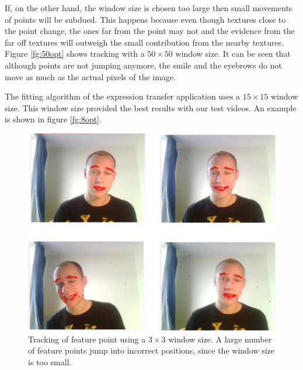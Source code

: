 \documentclass[11pt,a4paper,twoside]{report}
\begin{document}
If, on the other hand, the window size is chosen too large then small movements of
points will be subdued. This happens because even though textures close to the
point change, the ones far from the point may not and the evidence from the far
off textures will outweigh the small contribution from the nearby
textures. Figure \ref{fg:50opt} shows tracking with a $50 \times 50$ window
size. It can be seen that although points are not jumping anymore, the smile and
the eyebrows do not move as much as the actual pixels of the image.

The fitting algorithm of the expression transfer application uses a $15 \times
15$ window size. This window size provided the best results with our test
videos. An example is shown in figure \ref{fg:8opt}.

\begin{figure}[H]
\begin{centering}
\includegraphics[scale=0.33]{images/3x3opt2.png}
\par\end{centering}

\caption{Tracking of feature point using a $3 \times 3$ window size. A large
  number of feature points jump into incorrect positions, since the
  window size is too small.}
\label{fg:3opt}
\end{figure}
\end{document}
